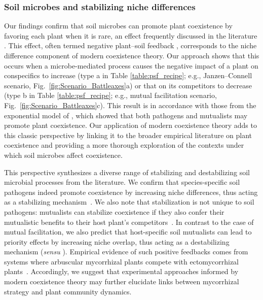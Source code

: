 \subsubsection*{Soil microbes and stabilizing niche differences}
Our findings confirm that soil microbes can promote plant coexistence by favoring each plant when it is rare, an effect frequently discussed in the literature \citep{Bever1997, Hart2003, Bever2003, KeMiki2015}.
This effect, often termed negative plant--soil feedback \citep{Bever1997}, corresponds to the niche difference component of modern coexistence theory.
Our approach shows that this occurs when a microbe-mediated process causes the negative impact of a plant on conspecifics to increase (type a in Table \ref{table:psf_recipe}; e.g., Janzen--Connell scenario, Fig.~\ref{fig:Scenario_Battleaxes}a) or that on its competitors to decrease (type b in Table \ref{table:psf_recipe}; e.g., mutual facilitation scenario, Fig.~\ref{fig:Scenario_Battleaxes}c).
This result is in accordance with those from the exponential model of \citet{Bever1997}, which showed that both pathogens and mutualists may promote plant coexistence.
Our application of modern coexistence theory adds to this classic perspective by linking it to the broader empirical literature on plant coexistence and providing a more thorough exploration of the contexts under which soil microbes affect coexistence.
\par


This perspective synthesizes a diverse range of stabilizing and destabilizing soil microbial processes from the literature.
We confirm that species-specific soil pathogens indeed promote coexistence by increasing niche differences, thus acting as a stabilizing mechanism~\citep{Petermann2008}. We also note that stabilization is not unique to soil pathogens: mutualists can stabilize coexistence if they also confer their mutualistic benefits to their host plant's competitors~\citep{Bever1999, Bever2002}.
In contrast to the case of mutual facilitation, we also predict that host-specific soil mutualists can lead to priority effects by increasing niche overlap, thus acting as a destabilizing mechanism (\textit{sensu} \citealt{Fukami2016}). Empirical evidence of such positive feedbacks comes from systems where arbuscular mycorrhizal plants compete with ectomycorrhizal plants~\citep{McGuire2007, Bennett2017, Kadowaki2017}.
Accordingly, we suggest that experimental approaches informed by modern coexistence theory may further elucidate links between mycorrhizal strategy and plant community dynamics.
\par


